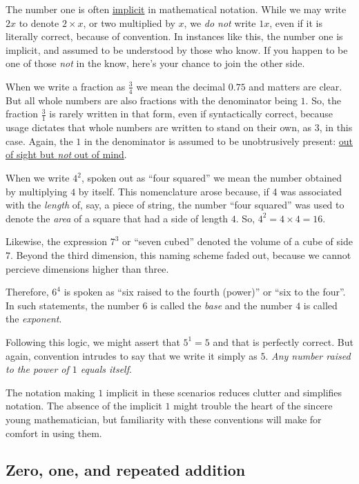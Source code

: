 \documentclass[
  a4paper,
]{article}
\begin{document}
The number one is often
\href{https://www.vocabulary.com/dictionary/implicit}{implicit} in
mathematical notation. While we may write \(2x\) to denote
\(2\times x\), or two multiplied by \(x\), we \emph{do not} write
\(1x\), even if it is literally correct, because of convention. In
instances like this, the number one is implicit, and assumed to be
understood by those who know. If you happen to be one of those
\emph{not} in the know, here's your chance to join the other side.

When we write a fraction as \(\frac{3}{4}\) we mean the decimal \(0.75\)
and matters are clear. But all whole numbers are also fractions with the
denominator being \(1\). So, the fraction \(\frac{3}{1}\) is rarely
written in that form, even if syntactically correct, because usage
dictates that whole numbers are written to stand on their own, as \(3\),
in this case. Again, the \(1\) in the denominator is assumed to be
unobtrusively present:
\href{https://dictionary.cambridge.org/dictionary/english/out-of-sight-out-of-mind}{out
of sight but \emph{not} out of mind}.

When we write \(4^2\), spoken out as ``four squared'' we mean the number
obtained by multiplying \(4\) by itself. This nomenclature arose
because, if 4 was associated with the \emph{length} of, say, a piece of
string, the number ``four squared'' was used to denote the \emph{area}
of a square that had a side of length \(4\). So,
\(4^2 = 4\times4 = 16\).

Likewise, the expression \(7^3\) or ``seven cubed'' denoted the volume
of a cube of side \(7\). Beyond the third dimension, this naming scheme
faded out, because we cannot percieve dimensions higher than three.

Therefore, \(6^4\) is spoken as ``six raised to the fourth (power)'' or
``six to the four''. In such statements, the number \(6\) is called the
\emph{base} and the number \(4\) is called the \emph{exponent}.

Following this logic, we might assert that \(5^1 = 5\) and that is
perfectly correct. But again, convention intrudes to say that we write
it simply as \(5\). \emph{Any number raised to the power of \(1\) equals
itself}.

The notation making \(1\) implicit in these scenarios reduces clutter
and simplifies notation. The absence of the implicit \(1\) might trouble
the heart of the sincere young mathematician, but familiarity with these
conventions will make for comfort in using them.

\hypertarget{zero-one-and-repeated-addition}{%
\subsection{Zero, one, and repeated
addition}\label{zero-one-and-repeated-addition}}
\end{document}
